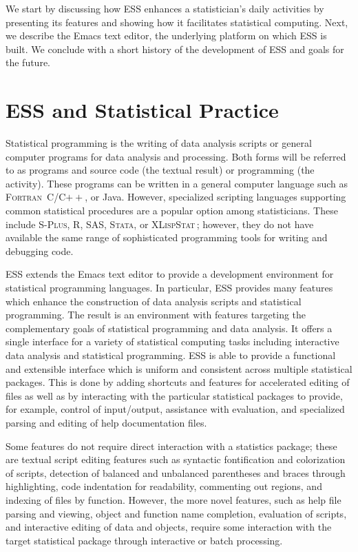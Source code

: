 \documentclass{article}
\newcommand*{\SAS}{\textsc{SAS}}
\newcommand*{\Splus}{\textsc{S-Plus}}
\newcommand*{\XLispStat}{\textsc{XLispStat}}
\newcommand*{\Stata}{\textsc{Stata}}
\newcommand*{\Fortran}{\textsc{Fortran}}
\begin{document}
We start by discussing how ESS enhances a statistician's daily
activities by presenting its features and showing how it facilitates
statistical computing.  Next, we describe the Emacs text editor, the
underlying platform on which ESS is built.  We conclude with a short
history of the development of ESS and goals for the future.

\section{ESS and Statistical Practice}
\label{sec:ess-extends-emacs}

Statistical programming is the writing of data analysis scripts or
general computer programs for data analysis and processing.  Both
forms will be referred to as programs and source code (the textual result) or
programming (the activity).
These programs can be written in a general computer language such as \Fortran\,
C/C$++$, or Java. However, specialized scripting languages supporting
common statistical procedures are a popular option among
statisticians.  These include \Splus, R, \SAS, \Stata, or
\XLispStat\,; however, they do not have available the same range of
sophisticated programming tools for writing and debugging code.

ESS extends the Emacs text editor to provide a development
environment for statistical programming languages. In
particular, ESS provides many features which enhance the construction
of data analysis scripts and statistical programming.  The result is
an environment with features targeting the complementary goals of
statistical programming and data analysis.  It offers a single
interface for a variety of statistical computing tasks including
interactive data analysis and statistical programming.  ESS is able to
provide a functional and extensible interface which is uniform and
consistent across multiple statistical packages.  This is done by
adding shortcuts and features for accelerated editing of files as well
as by interacting with the particular statistical packages to provide,
for example, control of input/output, assistance with evaluation, and
specialized parsing and editing of help documentation files.


Some features do not require direct interaction with a statistics
package; these are textual script editing features such as syntactic
fontification and colorization of scripts, detection of balanced and
unbalanced parentheses and braces through highlighting, code indentation
for readability, commenting out regions, and indexing of files by
function.  However, the more novel features, such as help file parsing
and viewing, object and function name completion, evaluation of
scripts, and interactive editing of data and objects, require some
interaction with the target statistical package through interactive or
batch processing.
\end{document}
